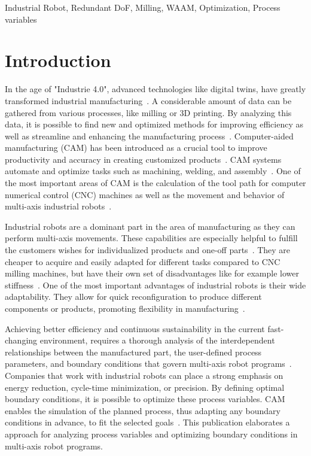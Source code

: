 \documentclass[conference]{IEEEtran}
\begin{document}
\begin{IEEEkeywords}
Industrial Robot, Redundant DoF, Milling, WAAM, Optimization, Process variables
\end{IEEEkeywords}

\section{Introduction}
In the age of "Industrie 4.0", advanced technologies like digital twins, have greatly transformed industrial manufacturing~\cite{Singh.2021}. A considerable amount of data can be gathered from various processes, like milling or 3D printing. By analyzing this data, it is possible to find new and optimized methods for improving efficiency as well as streamline and enhancing the manufacturing process~\cite{Ghobakhloo.2020}.
Computer-aided manufacturing (CAM) has been introduced as a crucial tool to improve productivity and accuracy in creating customized products~\cite{Feldhausen.2022}. CAM systems automate and optimize tasks such as machining, welding, and assembly~\cite{LalitNarayan.2013b}. One of the most important areas of CAM is the calculation of the tool path for computer numerical control (CNC) machines as well as the movement and behavior of multi-axis industrial robots~\cite{Pan}. 

Industrial robots are a dominant part in the area of manufacturing as they can perform multi-axis movements. These capabilities are especially helpful to fulfill the customers wishes for individualized products and one-off parts~\cite{Sherwani.2020}. They are cheaper to acquire and easily adapted for different tasks compared to CNC milling machines, but have their own set of disadvantages like for example lower stiffness~\cite{Iglesias.2015, Liberman.2021}. One of the most important advantages of industrial robots is their wide adaptability. They allow for quick reconfiguration to produce different components or products, promoting flexibility in manufacturing~\cite{Billard.2019}. 

Achieving better efficiency and continuous sustainability in the current fast-changing environment, requires a thorough analysis of the interdependent relationships between the manufactured part, the user-defined process parameters, and boundary conditions that govern multi-axis robot programs~\cite{Pan, Gadaleta.2019}. Companies that work with industrial robots can place a strong emphasis on energy reduction, cycle-time minimization, or precision. By defining optimal boundary conditions, it is possible to optimize these process variables. CAM enables the simulation of the planned process, thus adapting any boundary conditions in advance, to fit the selected goals~\cite{Kyratsis.2020,Maiti.2017,Pan,Uhlmann.2016}.
This publication elaborates a approach for analyzing process variables and optimizing boundary conditions in multi-axis robot programs. 
\end{document}
